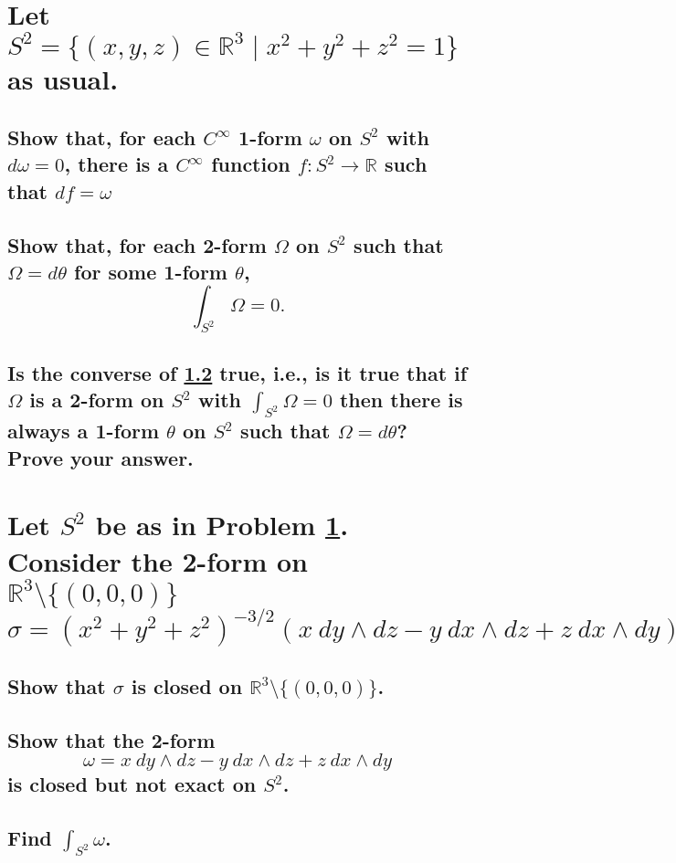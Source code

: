 \documentclass[10pt]{article}
\begin{document}
\section{Let $S^2 = \{ (x,y,z) \in \mathbb{R} ^3 \mid x^2 + y^2 +z^2 =1 \}$ as usual.}
\label{four}

\subsection{Show that, for each $C^\infty$ 1-form $\omega$ on $S^2$ with $d \omega =0$, there is a
  $C^\infty$ function $f : S^2 \to \mathbb{R} $ such that $df = \omega$}

\subsection{Show that, for each 2-form $\Omega$ on $S^2$ such that $\Omega = d \theta$ for some
  1-form $\theta$, $$\int_{S^2} \Omega =0.$$}
\label{drh}


\subsection{Is the converse of \ref{drh} true, i.e., is it true that if $\Omega$ is a 2-form on
  $S^2$ with $\int_{S^2} \Omega =0$ then there is always a 1-form $\theta$ on $S^2$ such that
  $\Omega = d \theta$? Prove your answer.}

\section{Let $S^2$ be as in Problem \ref{four}. Consider the 2-form on $\mathbb{R}^3 \setminus
  \{(0,0,0)\}$ $$\sigma = (x^2 + y^2 + z^2)^{-3/2} (x\ dy \wedge dz - y\ dx \wedge dz + z\ dx \wedge
  dy).$$}

\subsection{Show that $\sigma$ is closed on $\mathbb{R} ^3 \setminus \{(0,0,0)\}$.}

\subsection{Show that the 2-form
$$\omega =  x\ dy \wedge dz - y\ dx \wedge dz + z\ dx \wedge dy$$
is closed but not exact on $S^2$.}

\subsection{Find $\int_{S^2} \omega$.}
\end{document}
